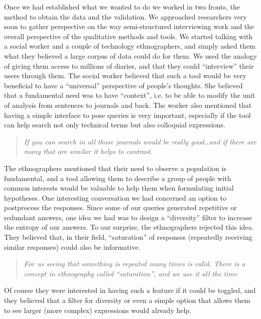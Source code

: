 \documentclass{sigchi}
\begin{document}
Once we had established what we wanted to do we worked in two fronts, the method to obtain the data and the validation. We approached researchers very soon to gather perspective on the way semi-structured interviewing work and the overall perspective of the qualitative methods and tools. We started talking with a social worker and a couple of technology ethnographers, and simply asked them what they believed a large corpus of data could do for them. We used the analogy of giving them access to millions of diaries, and that they could ``interview'' their users through them. The social worker believed that such a tool would be very beneficial to have a ``universal'' perspective of people's thoughts. She believed that a fundamental need was to have ``context'', i.e. to be able to modify the unit of analysis from sentences to journals and back. The worker also mentioned that having a simple interface to pose queries is very important, especially if the tool can help search not only technical terms but also colloquial expressions. 

\begin{quote}
{\em
If you can search in all those journals would be really good\dots and if there are many that are similar it helps to contrast. 
}\end{quote}

The ethnographers mentioned that their need to observe a population is fundamental, and a tool allowing them to describe a group of people with common interests would be valuable to help them when formulating initial hypotheses. One interesting conversation we had concerned an option to postprocess the responses. Since some of our queries generated repetitive or redundant answers, one idea we had was to design a ``diversity'' filter to increase the entropy of our answers. To our surprise, the ethnographers rejected this idea. They believed that, in their field, ``saturation'' of responses (repeatedly receiving similar responses) could also be informative.

\begin{quote}
{\em
For us seeing that something is repeated many times is valid. There is a concept in ethnography called ``saturation'', and we use it all the time
}\end{quote}

Of course they were interested in having such a feature if it could be toggled, and they believed that a filter for diversity or even a simple option that allows them to see larger (more complex) expressions would already help.
\end{document}

